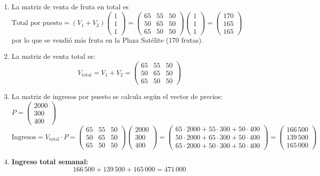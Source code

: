 \begin{myproof}
\begin{enumerate}[$(a)$]
\item La matriz de venta de fruta en total es 
\(
\text{Total por puesto} = \left(V_1 + V_2\right) \begin{pmatrix} 1 \\ 1 \\ 1 \end{pmatrix} = \begin{pmatrix}
65 & 55 & 50 \\
50 & 65 & 50 \\
65 & 50 & 50
\end{pmatrix} \begin{pmatrix} 1 \\ 1 \\ 1 \end{pmatrix} = \begin{pmatrix} 170 \\ 165 \\ 165 \end{pmatrix}
\) por lo que se vendió más fruta en la Plaza Satélite (170 frutas).

\item La matriz de venta total es:
\[
V_{\text{total}} = V_1 + V_2 = \begin{pmatrix}
65 & 55 & 50 \\
50 & 65 & 50 \\
65 & 50 & 50
\end{pmatrix}
\]

\item La matriz de ingresos por puesto se calcula según el vector de precios: $P = \begin{pmatrix} 2000 \\ 300 \\ 400 \end{pmatrix}$
\[
\text{Ingresos} = V_{\text{total}} \cdot P = \begin{pmatrix}
65 & 55 & 50 \\
50 & 65 & 50 \\
65 & 50 & 50
\end{pmatrix} \begin{pmatrix} 2000 \\ 300 \\ 400 \end{pmatrix} = \begin{pmatrix}
65\cdot2000 + 55\cdot300 + 50\cdot400 \\
50\cdot2000 + 65\cdot300 + 50\cdot400 \\
65\cdot2000 + 50\cdot300 + 50\cdot400
\end{pmatrix} = \begin{pmatrix}
166\,500 \\
139\,500 \\
165\,000
\end{pmatrix}
\]

\item \textbf{Ingreso total semanal:}
\[
166\,500 + 139\,500 + 165\,000 = \boxed{471\,000}
\]
\end{enumerate}
\end{myproof}
